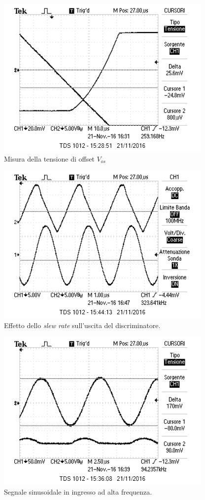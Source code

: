 \documentclass[10pt,a4paper]{article}
\begin{document}
\begin{figure}[htb!]
\centering
\includegraphics[scale=1.0]{immagini/Vos.png}
\caption{Misura della tensione di offset $V_{os}$}
\label{Vos}
\end{figure}

\begin{figure}[htb!]
\centering
\includegraphics[scale=1.0]{immagini/slewRate.png}
\caption{Effetto dello \emph{slew rate} sull'uscita del discriminatore.}
\label{slewRate}
\end{figure}

\begin{figure}[htb!]
\centering
\includegraphics[scale=1.0]{immagini/prodottoBandaGuadagno2.png}
\caption{Segnale sinusoidale in ingresso ad alta frequenza.}
\label{clipping}
\end{figure}
\end{document}
